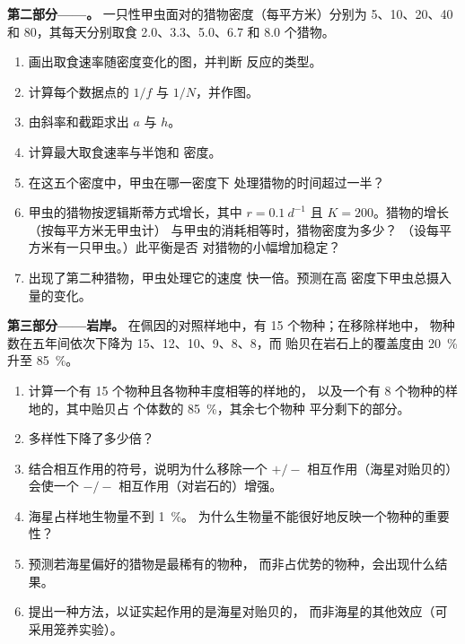 \begin{problem}
\medskip
\noindent\textbf{第二部分——。}
一只性甲虫面对的猎物密度（每平方米）分别为 5、10、20、40 和
80，其每天分别取食 2.0、3.3、5.0、6.7 和 8.0
个猎物。
\begin{enumerate}[resume]
  \item 画出取食速率随密度变化的图，并判断
        反应的类型。
  \item 计算每个数据点的 $1/f$ 与 $1/N$，并作图。
  \item 由斜率和截距求出 $a$ 与 $h$。
  \item 计算最大取食速率与半饱和
        密度。
  \item 在这五个密度中，甲虫在哪一密度下
        处理猎物的时间超过一半？
  \item 甲虫的猎物按逻辑斯蒂方式增长，其中 $r = \qty{0.1}{d^{-1}}$
        且 $K = 200$。猎物的增长（按每平方米无甲虫计）
        与甲虫的消耗相等时，猎物密度为多少？
        （设每平方米有一只甲虫。）此平衡是否
        对猎物的小幅增加稳定？
  \item 出现了第二种猎物，甲虫处理它的速度
        快一倍。预测在高
        密度下甲虫总摄入量的变化。
\end{enumerate}

\medskip
\noindent\textbf{第三部分——岩岸。}
在佩因的对照样地中，有 15 个物种；在移除样地中，
物种数在五年间依次下降为 15、12、10、9、8、8，而
贻贝在岩石上的覆盖度由 \qty{20}{\%} 升至 \qty{85}{\%}。
\begin{enumerate}[resume]
  \item 计算一个有 15 个物种且各物种丰度相等的样地的，
        以及一个有 8 个物种的样地的，其中贻贝占
        个体数的 \qty{85}{\%}，其余七个物种
        平分剩下的部分。
  \item 多样性下降了多少倍？
  \item 结合相互作用的符号，说明为什么移除一个
        $+/-$ 相互作用（海星对贻贝的）会使一个 $-/-$
        相互作用（对岩石的）增强。
  \item 海星占样地生物量不到 \qty{1}{\%}。
        为什么生物量不能很好地反映一个物种的重要性？
  \item 预测若海星偏好的猎物是最稀有的物种，
        而非占优势的物种，会出现什么结果。
  \item 提出一种方法，以证实起作用的是海星对贻贝的，
        而非海星的其他效应（可采用笼养实验）。
\end{enumerate}


\end{problem}

